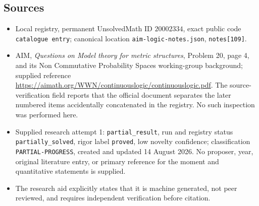 \documentclass[11pt]{article}
\begin{document}
\subsection{Sources}
\begin{itemize}
\item Local registry, permanent UnsolvedMath ID \(20002334\), exact public code \texttt{catalogue entry}; canonical location \texttt{aim-logic-notes.json}, \texttt{notes[109]}.
\item AIM, \emph{Questions on Model theory for metric structures}, Problem 20, page 4, and its Non Commutative Probability Spaces working-group background; supplied reference \url{https://aimath.org/WWN/continuouslogic/continuouslogic.pdf}. The source-verification field reports that the official document separates the later numbered items accidentally concatenated in the registry. No such inspection was performed here.
\item Supplied research attempt 1: \texttt{partial\_result}, run and registry status \texttt{partially\_solved}, rigor label \texttt{proved}, low novelty confidence; classification \texttt{PARTIAL-PROGRESS}, created and updated 14 August 2026. No proposer, year, original literature entry, or primary reference for the moment and quantitative statements is supplied.
\item The research aid explicitly states that it is machine generated, not peer reviewed, and requires independent verification before citation.
\end{itemize}
\end{document}
